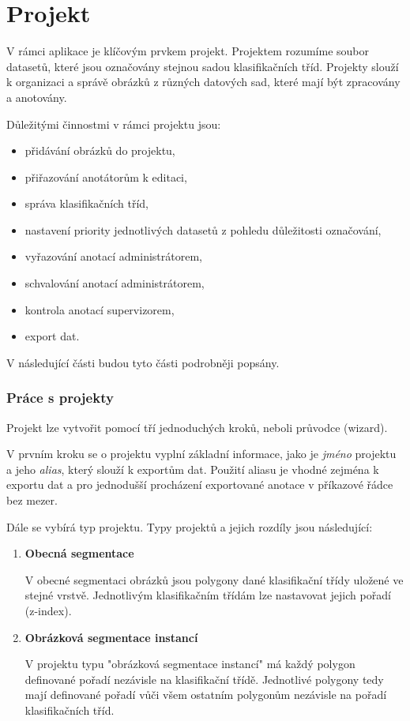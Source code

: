 \section{Projekt}
V rámci aplikace je klíčovým prvkem projekt. Projektem rozumíme soubor datasetů, které jsou označovány stejnou sadou klasifikačních tříd. Projekty slouží k organizaci a správě obrázků z různých datových sad, které mají být zpracovány a anotovány.

Důležitými činnostmi v rámci projektu jsou:
\begin{itemize}
    \item přidávání obrázků do projektu,
    \item přiřazování anotátorům k editaci,
    \item správa klasifikačních tříd,
    \item nastavení priority jednotlivých datasetů z pohledu důležitosti označování,
    \item vyřazování anotací administrátorem,
    \item schvalování anotací administrátorem,
    \item kontrola anotací supervizorem,
    \item export dat.
\end{itemize}

V následující části budou tyto části podrobněji popsány.

\subsubsection{Práce s projekty}
Projekt lze vytvořit pomocí tří jednoduchých kroků, neboli průvodce (wizard). 

V prvním kroku se o projektu vyplní základní informace, jako je \textit{jméno} projektu a jeho \textit{alias}, který slouží k exportům dat. Použití aliasu je vhodné zejména k exportu dat a pro jednodušší procházení exportované anotace v příkazové řádce bez mezer.

Dále se vybírá typ projektu. Typy projektů a jejich rozdíly jsou následující:

\begin{enumerate}
    \item \textbf{Obecná segmentace}

    V obecné segmentaci obrázků jsou polygony dané klasifikační třídy uložené ve stejné vrstvě. Jednotlivým klasifikačním třídám lze nastavovat jejich pořadí (z-index).

    \item \textbf{Obrázková segmentace instancí}

    V projektu typu "obrázková segmentace instancí" má každý polygon definované pořadí nezávisle na klasifikační třídě. Jednotlivé polygony tedy mají definované pořadí vůči všem ostatním polygonům nezávisle na pořadí klasifikačních tříd.
    
\end{enumerate}


